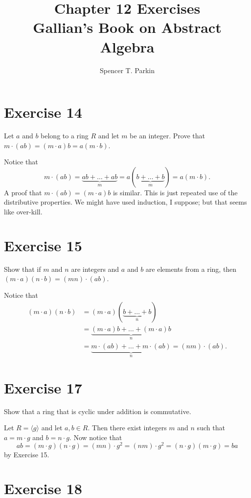 \documentclass[12pt]{article}
\title{Chapter 12 Exercises\\Gallian's Book on Abstract Algebra}
\author{Spencer T. Parkin}
\begin{document}
\maketitle

\section*{Exercise 14}

Let $a$ and $b$ belong to a ring $R$ and let $m$ be an integer.  Prove
that $m\cdot (ab)=(m\cdot a)b=a(m\cdot b)$.

Notice that
\begin{equation*}
m\cdot (ab)=\underbrace{ab+\dots+ab}_m=a(\underbrace{b+\dots+b}_m)=a(m\cdot b).
\end{equation*}
A proof that $m\cdot (ab)=(m\cdot a)b$ is similar.  This is just repeated use of the distributive
properties.  We might have used induction, I suppose; but that seems like over-kill.

\section*{Exercise 15}

Show that if $m$ and $n$ are integers and $a$ and $b$ are elements from a ring,
then $(m\cdot a)(n\cdot b)=(mn)\cdot(ab)$.

Notice that
\begin{align*}
(m\cdot a)(n\cdot b) &= (m\cdot a)(\underbrace{b+\dots+b}_n) \\
 &= \underbrace{(m\cdot a)b+\dots+(m\cdot a)b}_n \\
 &= \underbrace{m\cdot (ab)+\dots+ m\cdot(ab)}_n = (nm)\cdot (ab).
\end{align*}

\section*{Exercise 17}

Show that a ring that is cyclic under addition is commutative.

Let $R=\langle g\rangle$ and let $a,b\in R$.
Then there exist integers $m$ and $n$ such that
$a=m\cdot g$ and $b=n\cdot g$.  Now notice that
\begin{equation*}
ab=(m\cdot g)(n\cdot g)=(mn)\cdot g^2=(nm)\cdot g^2=(n\cdot g)(m\cdot g)=ba
\end{equation*}
by Exercise 15.

\section*{Exercise 18}
\end{document}
